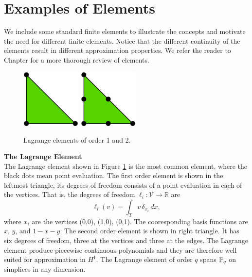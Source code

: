 \section{Examples of Elements}

We include some standard finite elements to illustrate the concepts and
motivate the need for different finite elements. Notice
that the different continuity of the elements result in
different approximation properties.
We refer the reader to Chapter \cite{missing} for a more thorough review of
elements.

\begin{figure}
  \begin{center}
    \includegraphics[height=3cm]{chapters/kirby-6/pdf/P1.pdf} \hspace{1.0cm}
    \includegraphics[height=3cm]{chapters/kirby-6/pdf/P2.pdf} \hspace{1.0cm}
    \caption{Lagrange elements of order 1 and 2.}
    \label{Lagrange}
  \end{center}
\end{figure}

\begin{example}{\bf{The Lagrange Element}} \\
The Lagrange element shown in Figure \ref{Lagrange} is the most common element,
where the black dots mean point evaluation.
The first order element is shown in the leftmost triangle, 
its degrees of freedom consists of a point evaluation in each of the vertices. 
That is, the degrees of freedom $\ell_i : \mathcal{V} \rightarrow \mathbb{R}$ are  
\begin{equation}
\ell_i ( v) = \int_{T} v \, \delta_{x_i} \, dx,   
\end{equation}
where $x_i$ are the vertices (0,0), (1,0), (0,1).
The cooresponding basis functions
are $x$, $y$, and $1-x-y$.  The second order element is shown in right 
triangle. It has six degrees of freedom, three at the vertices and three
at the edges. 
The Lagrange element produce piecewise continuous polynomials and they are therefore
well suited for approximation in $H^1$.
The Lagrange element of order $q$ spans $\P_q$ on simplices in any dimension.  
\end{example}

